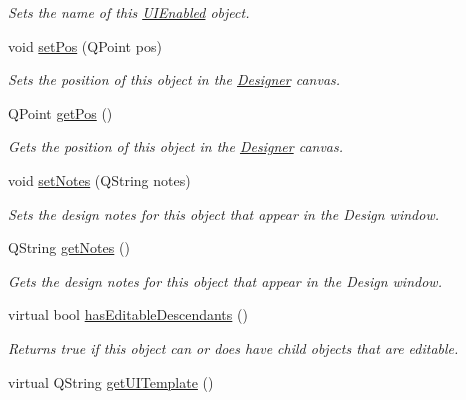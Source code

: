 \begin{DoxyCompactItemize}
\begin{DoxyCompactList}\small\item\em Sets the name of this \hyperlink{class_picto_1_1_u_i_enabled}{U\-I\-Enabled} object. \end{DoxyCompactList}\item 
void \hyperlink{class_picto_1_1_u_i_enabled_ad73c311e8e6d4489ca69be4508622ff8}{set\-Pos} (Q\-Point pos)
\begin{DoxyCompactList}\small\item\em Sets the position of this object in the \hyperlink{class_designer}{Designer} canvas. \end{DoxyCompactList}\item 
Q\-Point \hyperlink{class_picto_1_1_u_i_enabled_a36439338cb329f47c8ca247346091869}{get\-Pos} ()
\begin{DoxyCompactList}\small\item\em Gets the position of this object in the \hyperlink{class_designer}{Designer} canvas. \end{DoxyCompactList}\item 
void \hyperlink{class_picto_1_1_u_i_enabled_a9c8357d95be07ccfead35dee74ddc064}{set\-Notes} (Q\-String notes)
\begin{DoxyCompactList}\small\item\em Sets the design notes for this object that appear in the Design window. \end{DoxyCompactList}\item 
Q\-String \hyperlink{class_picto_1_1_u_i_enabled_a633ba2f43657af31ab75dde4ee57bee0}{get\-Notes} ()
\begin{DoxyCompactList}\small\item\em Gets the design notes for this object that appear in the Design window. \end{DoxyCompactList}\item 
virtual bool \hyperlink{class_picto_1_1_u_i_enabled_aa9146adb2bb548fd5763be8d7a6f97d1}{has\-Editable\-Descendants} ()
\begin{DoxyCompactList}\small\item\em Returns true if this object can or does have child objects that are editable. \end{DoxyCompactList}\item 
\hypertarget{class_picto_1_1_u_i_enabled_aaefaa1a16d116cd724c2bc7c19c797de}{virtual Q\-String \hyperlink{class_picto_1_1_u_i_enabled_aaefaa1a16d116cd724c2bc7c19c797de}{get\-U\-I\-Template} ()}\label{class_picto_1_1_u_i_enabled_aaefaa1a16d116cd724c2bc7c19c797de}


\end{DoxyCompactItemize}
